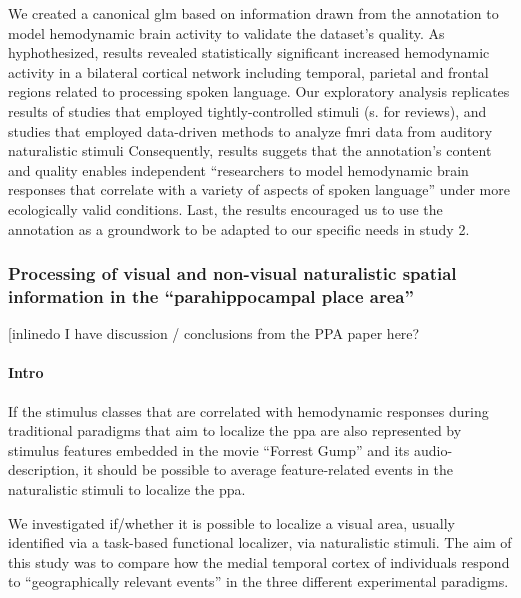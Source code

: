 We created a canonical \ac{glm} based on information drawn from the annotation
to model hemodynamic brain activity to validate the dataset's quality.
As hyphothesized, results revealed statistically significant increased
hemodynamic activity in a bilateral cortical network including temporal,
parietal and frontal regions related to processing spoken language.
Our exploratory analysis replicates results of studies that employed
tightly-controlled stimuli (s. \citep{friederici2011brain,
hickok2007cortical,price2012twentyyears} for reviews), and studies that employed
data-driven methods to analyze \ac{fmri} data from auditory naturalistic stimuli
\citep{honey2012not, lerner2011topographic, silbert2014coupled}
Consequently, results suggets that the annotation's content and quality enables
independent ``researchers to model hemodynamic brain responses that correlate
with a variety of aspects of spoken language'' \citep{haeusler2021speechanno}
under more ecologically valid conditions.
Last, the results encouraged us to use the annotation as a groundwork to be
adapted to our specific needs in study 2.


\subsubsection{Processing of visual and non-visual naturalistic spatial
information in the ``parahippocampal place area''}


\todo[inline{do I have discussion / conclusions from the PPA paper here?}


\paragraph{Intro}
%
If the stimulus classes that are correlated with hemodynamic responses during
traditional paradigms that aim to localize the \ac{ppa} are also represented by
stimulus features embedded in the movie ``Forrest Gump'' and its
audio-description, it should be possible to average feature-related events in
the naturalistic stimuli to localize the \ac{ppa}.

%
We investigated if/whether it is possible to localize a visual area, usually
identified via a task-based functional localizer, via naturalistic stimuli.
%
The aim of this study was to compare how the medial temporal cortex of
individuals respond to “geographically relevant events” in the  three different
experimental paradigms.


